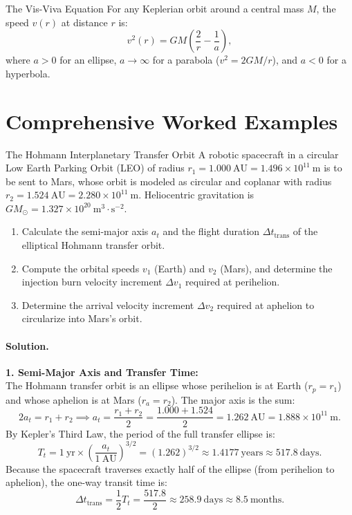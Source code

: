 \begin{lawbox}{The Vis-Viva Equation}
For any Keplerian orbit around a central mass $M$, the speed $v(r)$ at distance $r$ is:
\begin{equation}
v^2(r) = G M \left( \frac{2}{r} - \frac{1}{a} \right),
\end{equation}
where $a > 0$ for an ellipse, $a \to \infty$ for a parabola ($v^2 = 2GM/r$), and $a < 0$ for a hyperbola.
\end{lawbox}

\section{Comprehensive Worked Examples}

\begin{workedexample}{The Hohmann Interplanetary Transfer Orbit}
A robotic spacecraft in a circular Low Earth Parking Orbit (LEO) of radius $r_1 = 1.000\ \mathrm{AU} = 1.496\times 10^{11}\ \mathrm{m}$ is to be sent to Mars, whose orbit is modeled as circular and coplanar with radius $r_2 = 1.524\ \mathrm{AU} = 2.280\times 10^{11}\ \mathrm{m}$. Heliocentric gravitation is $G M_\odot = 1.327\times 10^{20}\ \mathrm{m^3\cdot s^{-2}}$.
\begin{enumerate}[leftmargin=1.4em,itemsep=3pt]
  \item Calculate the semi-major axis $a_t$ and the flight duration $\Delta t_{\text{trans}}$ of the elliptical Hohmann transfer orbit.
  \item Compute the orbital speeds $v_1$ (Earth) and $v_2$ (Mars), and determine the injection burn velocity increment $\Delta v_1$ required at perihelion.
  \item Determine the arrival velocity increment $\Delta v_2$ required at aphelion to circularize into Mars's orbit.
\end{enumerate}

\paragraph{Solution.}
\textbf{1. Semi-Major Axis and Transfer Time:}\\
The Hohmann transfer orbit is an ellipse whose perihelion is at Earth ($r_p = r_1$) and whose aphelion is at Mars ($r_a = r_2$). The major axis is the sum:
\[
2a_t = r_1 + r_2 \implies a_t = \frac{r_1 + r_2}{2} = \frac{1.000 + 1.524}{2} = 1.262\ \mathrm{AU} = 1.888\times 10^{11}\ \mathrm{m}.
\]
By Kepler's Third Law, the period of the full transfer ellipse is:
\[
T_t = 1\ \mathrm{yr} \times \left(\frac{a_t}{1\ \mathrm{AU}}\right)^{3/2} = (1.262)^{3/2} \approx 1.4177\ \mathrm{years} \approx 517.8\ \mathrm{days}.
\]
Because the spacecraft traverses exactly half of the ellipse (from perihelion to aphelion), the one-way transit time is:
\[
\Delta t_{\text{trans}} = \frac{1}{2} T_t = \frac{517.8}{2} \approx 258.9\ \mathrm{days} \approx 8.5\ \mathrm{months}.
\]


\end{workedexample}
